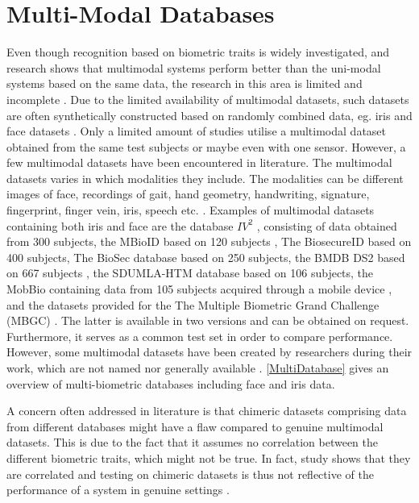 \section{Multi-Modal Databases}
\label{sec:multi_modal_data}
Even though recognition based on biometric traits is widely investigated, and research shows that multimodal systems perform better than the uni-modal systems based on the same data, the research in this area is limited and incomplete \citep{Chen2005a,Bowyer2016b}. Due to the limited availability of multimodal datasets, such datasets are often synthetically constructed based on randomly combined data, eg. iris and face datasets \citep{Chen2005a}. Only a limited amount of studies  utilise a multimodal dataset obtained from the same test subjects or maybe even with one sensor. However, a few multimodal datasets have been encountered in literature. The multimodal datasets varies in which modalities they include. The modalities can be different images of face, recordings of gait, hand geometry, handwriting, signature, fingerprint, finger vein, iris, speech etc. \citep{Yin2011, Dessimoz2007, Ross2003, Ortega-Garcia2010}. Examples of multimodal datasets containing both iris and face are the database $IV^2$ \citep{Petrovska-Delacretaz2008a}, consisting of data obtained from 300 subjects, the MBioID based on 120 subjects \citep{Dessimoz2007}, The BiosecureID based on 400 subjects, The BioSec database based on 250 subjects, the BMDB DS2 based on 667 subjects \citep{Ortega-Garcia2010}, the SDUMLA-HTM database based on 106 subjects, the MobBio containing data from 105 subjects acquired through a mobile device \citep{Sequeira2014}, and the datasets provided for the The Multiple Biometric Grand Challenge (MBGC) \citep{Bowyer2016b}. The latter is available in two versions and can be obtained on request. Furthermore, it serves as a common test set in order to compare performance. However, some multimodal datasets have been created by researchers during their work, which are not named nor generally available \citep{Bowyer2016b}. \autoref{MultiDatabase} gives an overview of multi-biometric databases including face and iris data. 

A concern often addressed in literature is that chimeric datasets comprising data from different databases might have a flaw compared to genuine multimodal datasets. This is due to the fact that it assumes no correlation between the different biometric traits, which might not be true. In fact, study shows that they are correlated and testing on chimeric datasets is thus not reflective of the performance of a system in genuine settings \citep{Al-Waisy2017a}.    

